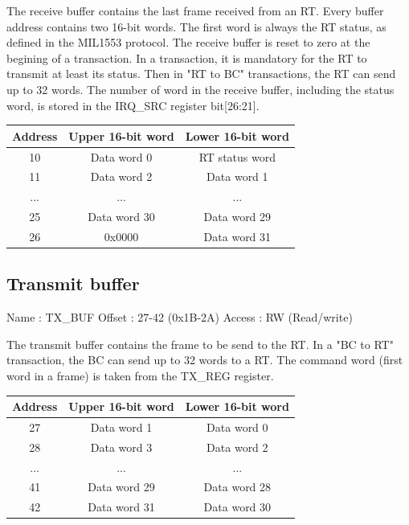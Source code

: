 \documentclass[11pt,a4paper]{article}
\begin{document}
The receive buffer contains the last frame received from an RT.
Every buffer address contains two 16-bit words.
The first word is always the RT status, as defined in the MIL1553 protocol.
The receive buffer is reset to zero at the begining of a transaction.
In a transaction, it is mandatory for the RT to transmit at least its status.
Then in "RT to BC" transactions, the RT can send up to 32 words.
The number of word in the receive buffer, including the status word, is stored in the IRQ\_SRC register bit[26:21].

\begin{table}[h!]
  \centering
  \begin{tabular}{ c c c }
    \hline
    \textbf{Address} & \textbf{Upper 16-bit word} & \textbf{Lower 16-bit word}\\
    \hline
    10 & Data word 0 & RT status word \\
    11 & Data word 2 & Data word 1 \\
    ... & ... & ... \\
    25 & Data word 30 & Data word 29 \\
    26 & 0x0000 & Data word 31 \\
    \hline
  \end{tabular}
\end{table}

\subsection{Transmit buffer}

Name   : TX\_BUF \newline
Offset : 27-42 (0x1B-2A) \newline
Access : RW (Read/write) \newline

The transmit buffer contains the frame to be send to the RT.
In a "BC to RT" transaction, the BC can send up to 32 words to a RT.
The command word (first word in a frame) is taken from the TX\_REG register.

\begin{table}[h!]
  \centering
  \begin{tabular}{ c c c }
    \hline
    \textbf{Address} & \textbf{Upper 16-bit word} & \textbf{Lower 16-bit word}\\
    \hline
    27 & Data word 1 & Data word 0 \\
    28 & Data word 3 & Data word 2 \\
    ... & ... & ... \\
    41 & Data word 29 & Data word 28 \\
    42 & Data word 31 & Data word 30 \\
    \hline
  \end{tabular}
\end{table}
\end{document}
